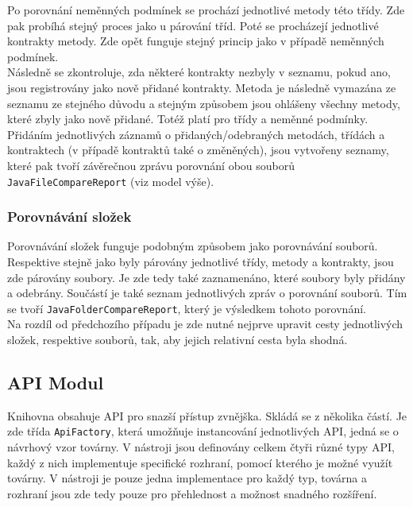 	    	Po porovnání neměnných podmínek se prochází jednotlivé metody této třídy. Zde pak probíhá stejný proces jako u párování tříd. Poté se procházejí jednotlivé kontrakty metody. Zde opět funguje stejný princip jako v případě neměnných podmínek.\\
	    	
	    	Následně se zkontroluje, zda některé kontrakty nezbyly v seznamu, pokud ano, jsou registrovány jako nově přidané kontrakty. Metoda je následně vymazána ze seznamu ze stejného důvodu a stejným způsobem jsou ohlášeny všechny metody, které zbyly jako nově přidané. Totéž platí pro třídy a neměnné podmínky. Přidáním jednotlivých záznamů o přidaných/odebraných metodách, třídách a kontraktech (v případě kontraktů také o změněných), jsou vytvořeny seznamy, které pak tvoří závěrečnou zprávu porovnání obou souborů \texttt{JavaFileCompareReport} (viz model výše).
	    
	    \subsubsection{Porovnávání složek}
			Porovnávání složek funguje podobným způsobem jako porovnávání souborů. Respektive stejně jako byly párovány jednotlivé třídy, metody a kontrakty, jsou zde párovány soubory. Je zde tedy také zaznamenáno, které soubory byly přidány a odebrány. Součástí je také seznam jednotlivých zpráv o porovnání souborů. Tím se tvoří \texttt{JavaFolderCompareReport}, který je výsledkem tohoto porovnání.\\
			
			Na rozdíl od předchozího případu je zde nutné nejprve upravit cesty jednotlivých složek, respektive souborů, tak, aby jejich relativní cesta byla shodná.

	    \subsection{API Modul}
	    	Knihovna obsahuje API pro snazší přístup zvnějška. Skládá se z několika částí. Je zde třída \texttt{ApiFactory}, která umožňuje instancování jednotlivých API, jedná se o návrhový vzor továrny. V nástroji jsou definovány celkem čtyři různé typy API, každý z nich implementuje specifické rozhraní, pomocí kterého je možné využít továrny. V nástroji je pouze jedna implementace pro každý typ, továrna a rozhraní jsou zde tedy pouze pro přehlednost a možnost snadného rozšíření.\\
	    	
